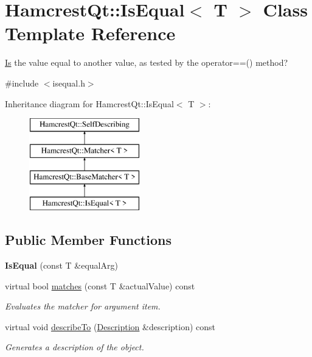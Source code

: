 \hypertarget{class_hamcrest_qt_1_1_is_equal}{\section{Hamcrest\-Qt\-:\-:Is\-Equal$<$ T $>$ Class Template Reference}
\label{class_hamcrest_qt_1_1_is_equal}
}


\hyperlink{class_hamcrest_qt_1_1_is}{Is} the value equal to another value, as tested by the operator==() method?  




{\ttfamily \#include $<$isequal.\-h$>$}

Inheritance diagram for Hamcrest\-Qt\-:\-:Is\-Equal$<$ T $>$\-:\begin{figure}[H]
\begin{center}
\leavevmode
\includegraphics[height=4.000000cm]{class_hamcrest_qt_1_1_is_equal}
\end{center}
\end{figure}
\subsection*{Public Member Functions}
\begin{DoxyCompactItemize}
\item 
\hypertarget{class_hamcrest_qt_1_1_is_equal_a4c0ff1098477674f9a510eff0df01eb0}{{\bfseries Is\-Equal} (const T \&equal\-Arg)}\label{class_hamcrest_qt_1_1_is_equal_a4c0ff1098477674f9a510eff0df01eb0}

\item 
virtual bool \hyperlink{class_hamcrest_qt_1_1_is_equal_a4a9cc0239c034328baa5aeedf340271f}{matches} (const T \&actual\-Value) const 
\begin{DoxyCompactList}\small\item\em Evaluates the matcher for argument {\itshape item}. \end{DoxyCompactList}\item 
virtual void \hyperlink{class_hamcrest_qt_1_1_is_equal_a0f8431cbae42ab84f803c33eb43af260}{describe\-To} (\hyperlink{class_hamcrest_qt_1_1_description}{Description} \&description) const 
\begin{DoxyCompactList}\small\item\em Generates a description of the object. \end{DoxyCompactList}\end{DoxyCompactItemize}


